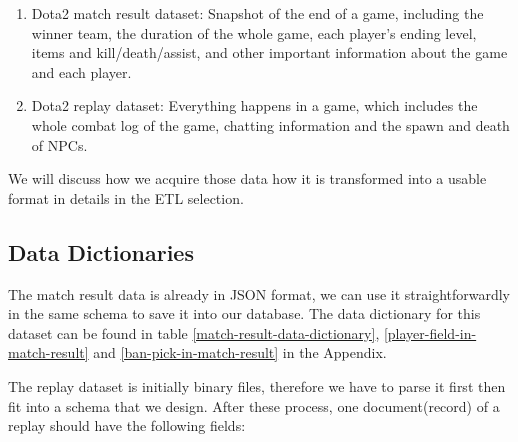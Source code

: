\documentclass{article}
\begin{document}
\begin{enumerate}
\item Dota2 match result dataset: Snapshot of the end of a game, including the winner team, the duration of the whole game, each player's ending level, items and kill/death/assist, and other important information about the game and each player.
\item Dota2 replay dataset: Everything happens in a game, which includes the whole combat log of the game, chatting information and the spawn and death of NPCs.
\end{enumerate}

We will discuss how we acquire those data how it is transformed into a usable format in details in the ETL selection.

\subsection{Data Dictionaries}

The match result data is already in JSON format, we can use it straightforwardly in the same schema to save it into our database. The data dictionary for this dataset can be found in table \ref{match-result-data-dictionary}, \ref{player-field-in-match-result} and \ref{ban-pick-in-match-result} in the Appendix.

The replay dataset is initially binary files, therefore we have to parse it first then fit into a schema that we design. After these process, one document(record) of a replay should have the following fields:
\end{document}
